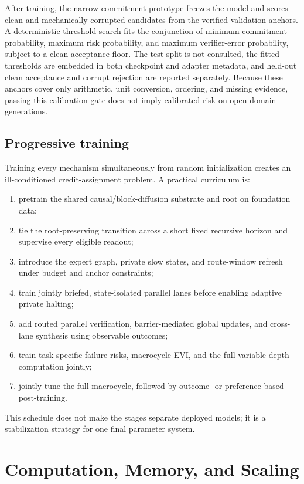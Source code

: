 \documentclass[10pt,a4paper]{article}
\begin{document}
After training, the narrow commitment prototype freezes the model and scores
clean and mechanically corrupted candidates from the verified validation
anchors. A deterministic threshold search fits the conjunction of minimum
commitment probability, maximum risk probability, and maximum verifier-error
probability, subject to a clean-acceptance floor. The test split is not
consulted, the fitted thresholds are embedded in both checkpoint and adapter
metadata, and held-out clean acceptance and corrupt rejection are reported
separately. Because these anchors cover only arithmetic, unit conversion,
ordering, and missing evidence, passing this calibration gate does not imply
calibrated risk on open-domain generations.

\subsection{Progressive training}

Training every mechanism simultaneously from random initialization creates an
ill-conditioned credit-assignment problem. A practical curriculum is:
\begin{enumerate}[label=\arabic*.]
\item pretrain the shared causal/block-diffusion substrate and root on
  foundation data;
\item tie the root-preserving transition across a short fixed recursive horizon
  and supervise every eligible readout;
\item introduce the expert graph, private slow states, and route-window refresh
  under budget and anchor constraints;
\item train jointly briefed, state-isolated parallel lanes before enabling
  adaptive private halting;
\item add routed parallel verification, barrier-mediated global updates, and
  cross-lane synthesis using observable outcomes;
\item train task-specific failure risks, macrocycle EVI, and the full
  variable-depth computation jointly;
\item jointly tune the full macrocycle, followed by outcome- or
  preference-based post-training.
\end{enumerate}
This schedule does not make the stages separate deployed models; it is a
stabilization strategy for one final parameter system.

\section{Computation, Memory, and Scaling}
\label{sec:compute}
\end{document}
